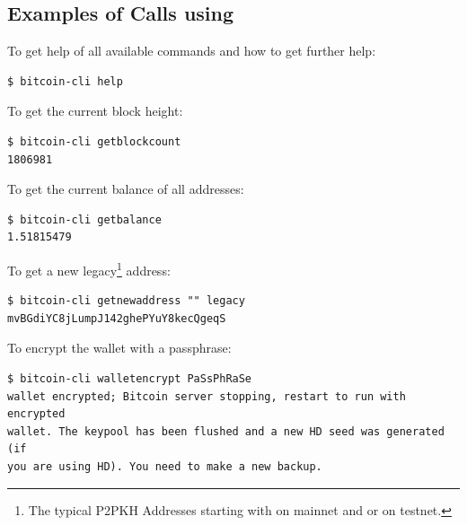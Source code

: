 \subsection*{Examples of Calls using }

To get help of all available commands and how to get further help:
\begin{emphbox}
\begin{lstlisting}[style=Bash]
$ bitcoin-cli help
\end{lstlisting}
\end{emphbox}
\vspace{1em}

\noindent To get the current block height:
\begin{emphbox}
\begin{lstlisting}[style=Bash]
$ bitcoin-cli getblockcount
1806981
\end{lstlisting}
\end{emphbox}
\vspace{1em}

\noindent To get the current balance of all addresses:
\begin{emphbox}
\begin{lstlisting}[style=Bash]
$ bitcoin-cli getbalance
1.51815479
\end{lstlisting}
\end{emphbox}
\vspace{1em}

\noindent To get a new legacy\footnote{The typical P2PKH Addresses starting with  on mainnet and  or  on testnet.} address:
\begin{emphbox}
\begin{lstlisting}[style=Bash]
$ bitcoin-cli getnewaddress "" legacy
mvBGdiYC8jLumpJ142ghePYuY8kecQgeqS
\end{lstlisting}
\end{emphbox}
\vspace{1em}

\noindent To encrypt the wallet with a passphrase:
\begin{emphbox}
\begin{lstlisting}[style=Bash]
$ bitcoin-cli walletencrypt PaSsPhRaSe
wallet encrypted; Bitcoin server stopping, restart to run with encrypted 
wallet. The keypool has been flushed and a new HD seed was generated (if 
you are using HD). You need to make a new backup.
\end{lstlisting}
\end{emphbox}
\vspace{1em}

